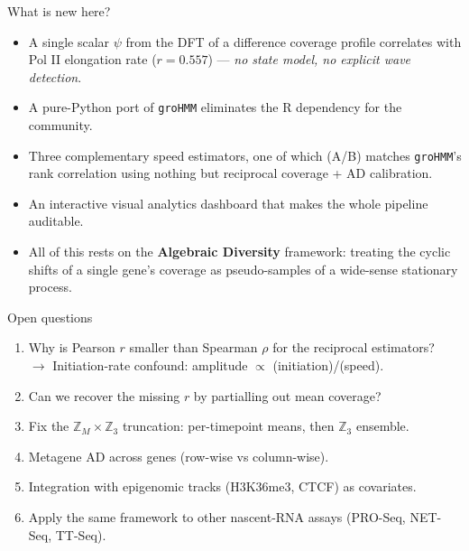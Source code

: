 \documentclass[aspectratio=169,10pt]{beamer}
\begin{document}
\begin{frame}{What is new here?}
\begin{itemize}
  \item A \alert{single scalar} $\psi$ from the DFT of a difference
        coverage profile correlates with Pol II elongation rate
        ($r = 0.557$) --- \emph{no state model, no explicit wave
        detection}.
  \item A \alert{pure-Python port} of \texttt{groHMM} eliminates the
        R dependency for the community.
  \item \alert{Three complementary speed estimators}, one of which
        (A/B) matches \texttt{groHMM}'s rank correlation using
        nothing but reciprocal coverage + AD calibration.
  \item An \alert{interactive visual analytics dashboard}
        that makes the whole pipeline auditable.
  \item All of this rests on the \textbf{Algebraic Diversity}
        framework: treating the cyclic shifts of a single gene's
        coverage as pseudo-samples of a wide-sense stationary
        process.
\end{itemize}
\end{frame}

\begin{frame}{Open questions}
\begin{enumerate}
  \item Why is Pearson $r$ smaller than Spearman $\rho$ for the
        reciprocal estimators? \\
        $\to$ Initiation-rate confound: amplitude $\propto$
        (initiation)/(speed).
  \item Can we recover the missing $r$ by partialling out mean
        coverage?
  \item Fix the $\mathbb{Z}_M \times \mathbb{Z}_3$ truncation:
        per-timepoint means, then $\mathbb{Z}_3$ ensemble.
  \item Metagene AD across genes (row-wise vs column-wise).
  \item Integration with epigenomic tracks
        (H3K36me3, CTCF) as covariates.
  \item Apply the same framework to other nascent-RNA assays
        (PRO-Seq, NET-Seq, TT-Seq).
\end{enumerate}
\end{frame}
\end{document}
